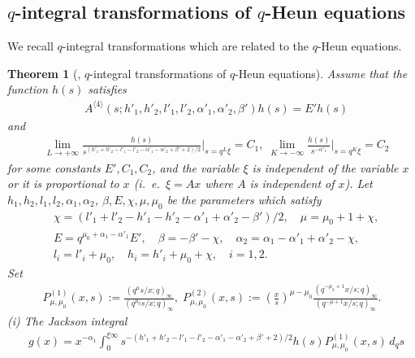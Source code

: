 \documentclass[12pt]{amsart}
\numberwithin{equation}{section}
\newtheorem{thm}{Theorem}[section]
\theoremstyle{definition}
\theoremstyle{remark}
\begin{document}
\subsection{$q$-integral transformations of $q$-Heun equations}
We recall $q$-integral transformations which are related to the $q$-Heun equations.
\begin{thm} [\cite{TakK}, $q$-integral transformations of $q$-Heun equations] \label{thm:q-trans}
Assume that the function $h(s)$ satisfies
\begin{align*}
& A^{\langle 4 \rangle} ( s; h'_1, h'_2, l'_1, l'_2, \alpha '_1, \alpha '_2, \beta ' ) h(s) = E' h(s) 
\end{align*}
and
\begin{align}
& \lim _{L \to +\infty } \frac{h(s)}{s^{(h'_1 + h'_2 - l'_1 - l'_2 - \alpha '_1 - \alpha '_2 + \beta ' +2)/2}} \big| _{s=q^{L} \xi } = C_1, \;  \lim _{K \to -\infty } \frac{h(s)}{s^{-\alpha ' _1}} \big| _{s=q^{K} \xi } = C_2 \label{eq:A4hslim}
\end{align}
for some constants $E', C_1 ,C_2$, and the variable $\xi $ is independent of the variable $x$ or it is proportional to $x$ (i.~e.~$\xi =Ax$ where $A $ is independent of $x$).
Let $h_1, h_2, l_1, l_2, \alpha _1, \alpha _2$, $\beta , E , \chi ,  \mu , \mu _0 $ be the parameters which satisfy
\begin{align}
    &  \chi = ( l'_1 + l'_2 - h'_1 - h'_2 - \alpha '_1 + \alpha '_2 - \beta ' )/2 , \quad \mu = \mu_{0} + 1 + \chi,  \label{eq:chi'} \\
    &E = q^{\mu _0 + \alpha _1 - \alpha ' _1 } E', \quad \beta = - \beta ' - \chi , \quad \alpha _2 = \alpha _1 - \alpha ' _1 + \alpha ' _2 - \chi , \nonumber \\
    & l_i = l'_i +\mu _0 , \quad h_i = h'_i +\mu _0 +\chi , \quad i = 1, 2 . \nonumber 
\end{align}
Set
\begin{align*}
 P_{\mu, \mu_{0}}^{(1)} (x, s) := \frac{(q^{\mu} s/x; q)_{\infty}}{(q^{\mu_{0}} s/x; q)_{\infty}}, \;  P_{\mu, \mu_{0}}^{(2)} (x, s) := \left(\frac{x}{s} \right)^{\mu - \mu_{0}} \frac{(q^{-\mu_{0} + 1} x/s; q)_{\infty}}{(q^{-\mu + 1} x/s; q)_{\infty}} .
\end{align*}
(i) The Jackson integral
\begin{align}
& g (x) = x^{- \alpha _1}  \int^{\xi \infty }_{0} s^{-(h'_1 + h'_2 - l'_1 - l'_2 - \alpha '_1 - \alpha '_2 + \beta ' +2)/2} h(s) P^{(1)}_{\mu ,\mu _0 } (x,s)  \, d_{q}s \label{eq:A4Jint}
\end{align}

\end{thm}
\end{document}
